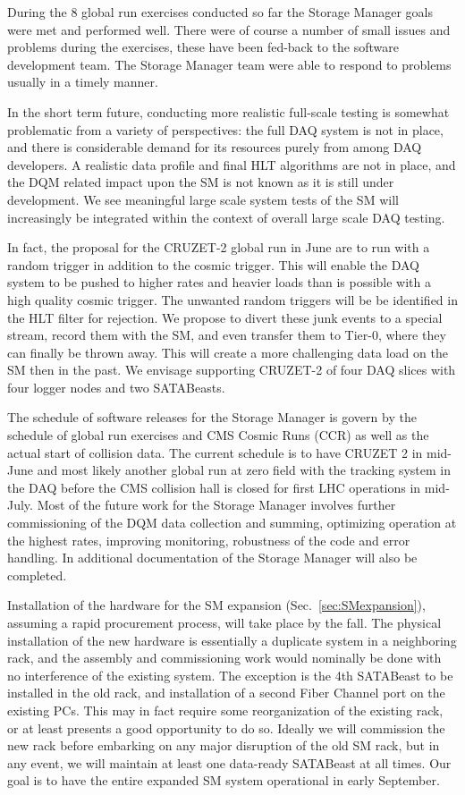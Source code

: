 During the 8 global run exercises conducted so far the Storage Manager goals
were met and performed well. There were of course a number of small
issues and problems during the exercises, these have been fed-back to the
software development team.
The Storage Manager team were able to respond to problems
usually in a timely manner.

In the short term future, conducting more realistic full-scale testing
is somewhat problematic from a variety of perspectives: 
the full DAQ system is not in place,
and there is considerable demand for its resources purely from among DAQ developers.
A realistic data profile and final HLT algorithms are not in place,
and the DQM related impact upon the SM is not known as it is still under development.
We see meaningful large scale system tests of the SM will increasingly be integrated
within the context of overall large scale DAQ testing.

In fact, the proposal for the CRUZET-2 global run in June are to run with a random trigger 
in addition to the cosmic trigger.
This will enable the DAQ system to be pushed to higher rates and heavier loads than
is possible with a high quality cosmic trigger. 
The unwanted random triggers will be be identified in the  HLT filter for rejection.
We propose to divert these junk events to a special stream, record them with the SM,
and even transfer them to Tier-0, where they can finally be thrown away.
This will create a more challenging data load on the SM then in the past.
We envisage supporting  CRUZET-2 of four DAQ slices with four logger nodes and two SATABeasts.



The schedule of software releases for the Storage Manager is govern by the
schedule of global run exercises and CMS Cosmic Runs (CCR) as well as
the actual start of collision data. The current schedule is to have CRUZET 2 in mid-June
and most likely another global run at zero field with the tracking system in the DAQ
before the CMS collision hall is closed for first LHC operations in mid-July.
Most of the future work for the
Storage Manager involves further commissioning of the
DQM data collection and summing, optimizing operation at the highest rates, improving
monitoring, robustness of the code and error handling. In additional documentation
of the Storage Manager will also be completed.

Installation of the hardware for the SM expansion (Sec.~\ref{sec:SMexpansion}), 
assuming a rapid procurement process, will take place by the fall.
The physical installation of the new hardware is essentially a duplicate
system in a neighboring rack, and the assembly and commissioning work
would nominally be done with no interference of the existing system.
The exception is the 4th SATABeast to be installed in the old rack,
and installation of a second Fiber Channel port on the existing PCs.
This may in fact require some reorganization of the existing rack, 
or at least presents a good opportunity to do so.
Ideally we will commission the new rack before embarking on any major
disruption of the old SM rack, but in any event, we will maintain
at least one data-ready SATABeast at all times.
Our goal is to have the entire expanded SM system operational
in early September.

